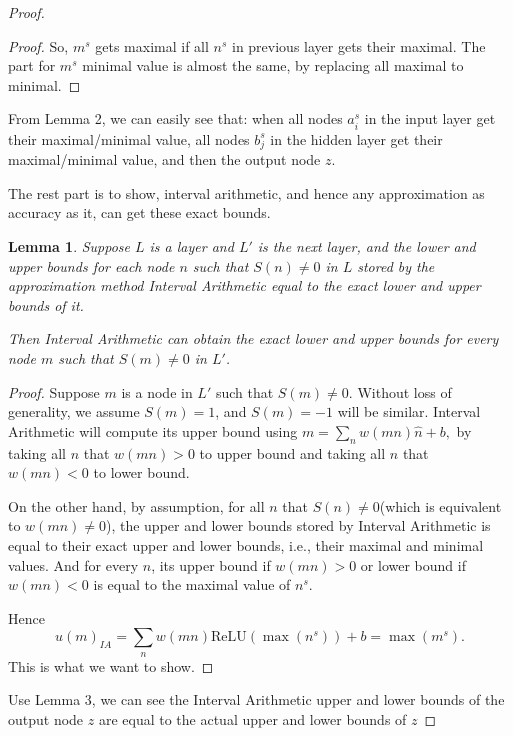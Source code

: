 \documentclass[]{article}
\newtheorem{lemma}{Lemma}
\theoremstyle{definition}
\newcommand{\ReLU}{\mathrm{ReLU}}
\begin{document}
\begin{proof}
\begin{proof}
	So, $m^s$ gets maximal if all $n^s$ in previous layer gets their maximal. The part for $m^s$ minimal value is almost the same, by replacing all maximal to minimal.
\end{proof}


From Lemma 2, we can easily see that: when all nodes $a_i^s$ in the input layer get their maximal/minimal value, all nodes $b_j^s$ in the hidden layer get their maximal/minimal value, and then the output node $z$.

The rest part is to show, interval arithmetic, and hence any approximation as accuracy as it, can get these exact bounds. 

\begin{lemma}
	Suppose $L$ is a layer and $L'$ is the next layer, and  the lower and upper bounds for each node $n$ such that $S(n)\neq 0$ in $L$ stored by the approximation method Interval Arithmetic equal to the exact lower and upper bounds of it.
	
	 Then Interval Arithmetic can obtain the exact lower and upper bounds for every node $m$ such that $S(m)\neq 0$ in $L'$.
\end{lemma}

\begin{proof}
	Suppose $m$ is a node in $L'$ such that $S(m)\neq 0$. Without loss of generality, we assume $S(m)=1$, and $S(m)=-1$ will be similar. Interval Arithmetic will compute its upper bound using $m=\sum_{n}w(mn)\hat{n}+b,$ by taking all $n$ that $w(mn)>0$ to upper bound and taking all $n$ that $w(mn)<0$ to lower bound.
	
	On the other hand, by assumption, for all $n$ that $S(n)\neq 0$(which is equivalent to $w(mn)\neq 0$), the upper and lower bounds stored by Interval Arithmetic is equal to their exact upper and lower bounds, i.e., their maximal and minimal values. And for every $n$, its upper bound if $w(mn)>0$ or lower bound if $w(mn)<0$ is equal to the maximal value of $n^s$. 
	
	Hence $$u(m)_{IA}=\sum_{n}w(mn)\ReLU(\max(n^s))+b=\max(m^s).$$ This is what we want to show.
\end{proof}

Use Lemma 3, we can see the Interval Arithmetic upper and lower bounds of the output node $z$ are equal to the actual upper and lower bounds of $z$



\end{proof}
\end{document}
